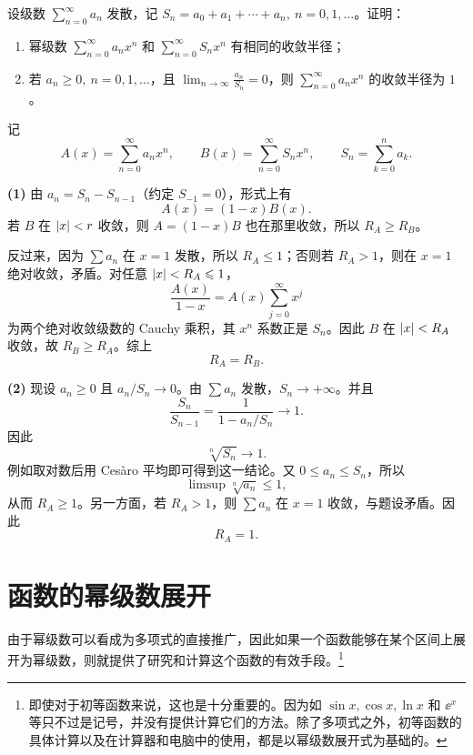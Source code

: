 \begin{xexercise}[13]
设级数 $\displaystyle\sum_{n=0}^{\infty}a_n$ 发散，记 $S_n=a_0+a_1+\cdots+a_n,\ n=0,1,\ldots$。证明：
  \begin{enumerate}[label=(\arabic*)]
    \item 幂级数 $\displaystyle\sum_{n=0}^{\infty}a_nx^n$ 和 $\displaystyle\sum_{n=0}^{\infty}S_nx^n$ 有相同的收敛半径；
    \item 若 $a_n\geqslant0,\ n=0,1,\ldots$，且 $\displaystyle\lim_{n\to\infty}\frac{a_n}{S_n}=0$，则 $\displaystyle\sum_{n=0}^{\infty}a_nx^n$ 的收敛半径为 $1$。
  \end{enumerate}
\end{xexercise}
\begin{xsolution}
记
\[
  A(x)=\sum_{n=0}^{\infty}a_nx^n,
  \qquad
  B(x)=\sum_{n=0}^{\infty}S_nx^n,
  \qquad S_n=\sum_{k=0}^na_k.
\]

\textbf{(1)} 由 $a_n=S_n-S_{n-1}$（约定 $S_{-1}=0$），形式上有
\[
  A(x)=(1-x)B(x).
\]
若 $B$ 在 $\lvert x\rvert<r$ 收敛，则 $A=(1-x)B$ 也在那里收敛，所以 $R_A\geqslant R_B$。

反过来，因为 $\sum a_n$ 在 $x=1$ 发散，所以 $R_A\leqslant1$；否则若 $R_A>1$，则在 $x=1$ 绝对收敛，矛盾。对任意 $\lvert x\rvert<R_A\leqslant1$，
\[
  \frac{A(x)}{1-x}=A(x)\sum_{j=0}^{\infty}x^j
\]
为两个绝对收敛级数的 Cauchy 乘积，其 $x^n$ 系数正是 $S_n$。因此 $B$ 在 $\lvert x\rvert<R_A$ 收敛，故 $R_B\geqslant R_A$。综上
\[
  \boxed{R_A=R_B}.
\]

\textbf{(2)} 现设 $a_n\geqslant0$ 且 $a_n/S_n\to0$。由 $\sum a_n$ 发散，$S_n\to+\infty$。并且
\[
  \frac{S_n}{S_{n-1}}
  =\frac1{1-a_n/S_n}\to1.
\]
因此
\[
  \sqrt[n]{S_n}\to1.
\]
例如取对数后用 Cesàro 平均即可得到这一结论。又 $0\leqslant a_n\leqslant S_n$，所以
\[
  \limsup\sqrt[n]{a_n}\leqslant1,
\]
从而 $R_A\geqslant1$。另一方面，若 $R_A>1$，则 $\sum a_n$ 在 $x=1$ 收敛，与题设矛盾。因此
\[
  \boxed{R_A=1}.
\]
\end{xsolution}


\section{函数的幂级数展开}

由于幂级数可以看成为多项式的直接推广，因此如果一个函数能够在某个区间上展开为幂级数，则就提供了研究和计算这个函数的有效手段。\footnote{即使对于初等函数来说，这也是十分重要的。因为如 $\sin x,\cos x,\ln x$ 和 $\ee^x$ 等只不过是记号，并没有提供计算它们的方法。除了多项式之外，初等函数的具体计算以及在计算器和电脑中的使用，都是以幂级数展开式为基础的。}

